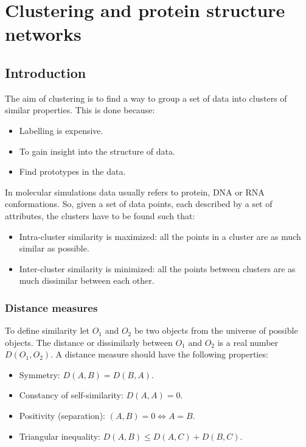 \graphicspath{{chapters/16/images/}}
\chapter{Clustering and protein structure networks}

\section{Introduction}
The aim of clustering is to find a way to group a set of data into clusters of similar properties.
This is done because:

\begin{multicols}{2}
	\begin{itemize}
		\item Labelling is expensive.
		\item To gain insight into the structure of data.
		\item Find prototypes in the data.
	\end{itemize}
\end{multicols}

In molecular simulations data usually refers to protein, DNA or RNA conformations.
So, given a set of data points, each described by a set of attributes, the clusters have to be found such that:

\begin{multicols}{2}
	\begin{itemize}
		\item Intra-cluster similarity is maximized: all the points in a cluster are as much similar as possible.
		\item Inter-cluster similarity is minimized: all the points between clusters are as much dissimilar between each other.
	\end{itemize}
\end{multicols}

	\subsection{Distance measures}
	To define similarity let $O_1$ and $O_2$ be two objects from the universe of possible objects.
	The distance or dissimilarly between $O_1$ and $O_2$ is a real number $D(O_1, O_2)$.
	A distance measure should have the following properties:

	\begin{itemize}
		\item Symmetry: $D(A,B) = D(B, A)$.
		\item Constancy of self-similarity: $D(A, A) = 0$.
		\item Positivity (separation): $(A, B) = 0\Leftrightarrow A=B$.
		\item Triangular inequality: $D(A, B) \le D(A, C) + D(B, C)$.
	\end{itemize}

